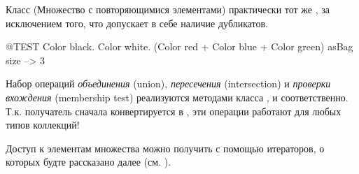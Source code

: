 \documentclass[a4paper,10pt,twoside]{book}
\begin{document}
Класс  (Множество с повторяющимися элементами) практически тот же , за исключением того, что допускает в себе наличие дубликатов.
\begin{code}{@TEST}
{ Color black. Color white. (Color red + Color blue + Color green) } asBag size --> 3
\end{code}

Набор операций \emph{объединения} (union), \emph{пересечения} (intersection) и \emph{проверки вхождения} (membership test) реализуются методами класса  ,  и  соответственно.
Т.к. получатель сначала конвертируется в , эти операции работают для любых типов коллекций!


Доступ к элементам множества можно получить с помощью итераторов, о которых будте рассказано далее (см. ).

\end{document}
